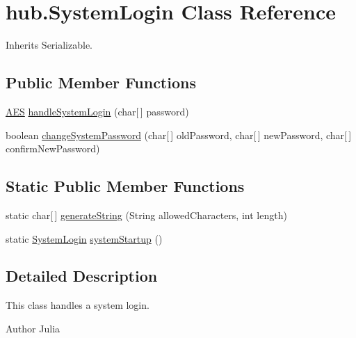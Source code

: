 \hypertarget{classhub_1_1_system_login}{
\section{hub.\-System\-Login \-Class \-Reference}
\label{classhub_1_1_system_login}
}


\-Inherits \-Serializable.

\subsection*{\-Public \-Member \-Functions}
\begin{DoxyCompactItemize}
\item 
\hyperlink{classsecurity_1_1_a_e_s}{\-A\-E\-S} \hyperlink{classhub_1_1_system_login_aa6bf447e9b5a0d42bd8c4a7a2236198c}{handle\-System\-Login} (char\mbox{[}$\,$\mbox{]} password)
\item 
boolean \hyperlink{classhub_1_1_system_login_afdd65eb65fdaa5635c3a860071ad2b5c}{change\-System\-Password} (char\mbox{[}$\,$\mbox{]} old\-Password, char\mbox{[}$\,$\mbox{]} new\-Password, char\mbox{[}$\,$\mbox{]} confirm\-New\-Password)
\end{DoxyCompactItemize}
\subsection*{\-Static \-Public \-Member \-Functions}
\begin{DoxyCompactItemize}
\item 
static char\mbox{[}$\,$\mbox{]} \hyperlink{classhub_1_1_system_login_a5401b1ac29a1bc4ef23c11095dd38671}{generate\-String} (\-String allowed\-Characters, int length)
\item 
static \hyperlink{classhub_1_1_system_login}{\-System\-Login} \hyperlink{classhub_1_1_system_login_a72a64aceecd9fd1b6dff4bbe1282ad07}{system\-Startup} ()
\end{DoxyCompactItemize}


\subsection{\-Detailed \-Description}
\-This class handles a system login. \begin{DoxyAuthor}{\-Author}
\-Julia 
\end{DoxyAuthor}


